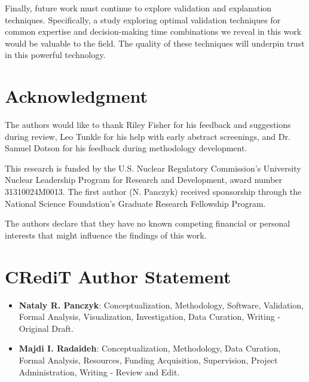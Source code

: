 \documentclass[authoryear,preprint,12pt]{elsarticle}
\begin{document}
Finally, future work must continue to explore validation and explanation
techniques. Specifically, a study exploring optimal validation techniques for
common expertise and decision-making time combinations we reveal in this work
would be valuable to the field. The quality of these techniques will underpin
trust in this powerful technology.  


\section{Acknowledgment}
The authors would like to thank Riley Fisher for his feedback and suggestions
during review, Leo Tunkle for his help with early abstract screenings, and Dr.
Samuel Dotson for his feedback during methodology development. 

This research is funded by the U.S. Nuclear Regulatory Commission's University
Nuclear Leadership Program for Research and Development, award number
31310024M0013. The first author (N. Panczyk) received sponsorship through the
National Science Foundation's Graduate Research Fellowship Program. 

The authors declare that they have no known competing financial or personal interests that might influence the findings of this work.

\section{CRediT Author Statement}
\begin{itemize}
    \item \textbf{Nataly R. Panczyk}: Conceptualization, Methodology, Software,
    Validation, Formal Analysis, Visualization, Investigation, Data Curation,
    Writing - Original Draft.   
    \item \textbf{Majdi I. Radaideh}: Conceptualization, Methodology, Data
    Curation, Formal Analysis, Resources, Funding Acquisition, Supervision,
    Project Administration, Writing - Review and Edit. 
\end{itemize}

 

\end{document}
